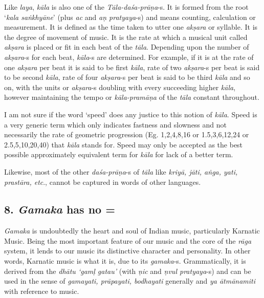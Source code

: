 Like \textit{laya}, \textit{kāla} is also one of the \textit{Tāla-daśa-prāṇa}-s. It is formed from the root ‘\textit{kala saṅkhyāne}’ (plus \textit{ac} and \textit{aṇ pratyaya}-s) and means counting, calculation or measurement. It is defined as the time taken to utter one \textit{akṣara} or syllable. It is the degree of movement of music. It is the rate at which a musical unit called \textit{akṣara} is placed or fit in each beat of the \textit{tāla}. Depending upon the number of \textit{akṣara}-s for each beat, \textit{kāla}-s are determined. For example, if it is at the rate of one \textit{akṣara} per beat it is said to be first \textit{kāla}, rate of two \textit{akṣara}-s per beat is said to be second \textit{kāla}, rate of four \textit{akṣara}-s per beat is said to be third \textit{kāla} and so on, with the units or \textit{akṣara}-s doubling with every succeeding higher \textit{kāla}, however maintaining the tempo or \textit{kāla-pramāṇa} of the \textit{tāla} constant throughout.

\newpage

I am not sure if the word ‘speed’ does any justice to this notion of \textit{kāla}. Speed is a very generic term which only indicates fastness and slowness and not necessarily the rate of geometric progression (Eg. 1,2,4,8,16 or 1.5,3,6,12,24 or 2.5,5,10,20,40) that \textit{kāla} stands for. Speed may only be accepted as the best possible approximately equivalent term for \textit{kāla} for lack of a better term.

Likewise, most of the other \textit{daśa-prāṇa}-s of \textit{tāla} like \textit{kriyā, jāti, aṅga, yati, prastāra, etc}., cannot be captured in words of other languages.


\subsection*{8. \textit{Gamaka} has no =}

\textit{Gamaka} is undoubtedly the heart and soul of Indian music, particularly Karnatic Music. Being the most important feature of our music and the core of the \textit{rāga} system, it lends to our music its distinctive character and personality. In other words, Karnatic music is what it is, due to its \textit{gamaka}-s. Grammatically, it is derived from the \textit{dhātu ‘gamḷ gatau’} (with \textit{ṇic} and \textit{ṇvul pratyaya}-s) and can be used in the sense of \textit{gamayati, prāpayati, bodhayati} generally and \textit{ya ātmānamiti} with reference to music.

